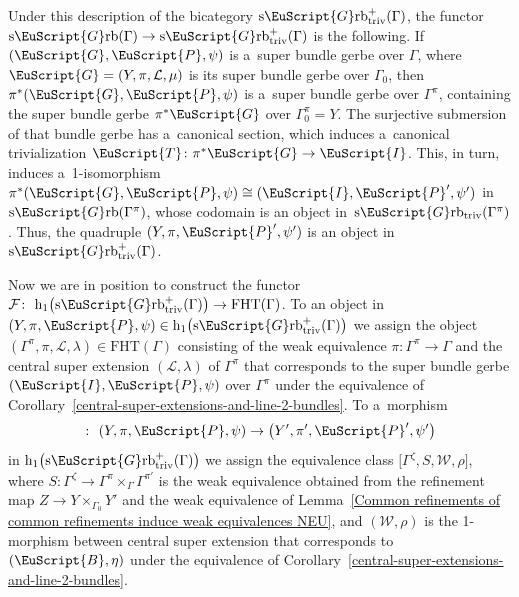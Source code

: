 \documentclass[pdftex]{sigma}
\numberwithin{equation}{section}
\def\mathscr#1{\EuScript{#1}}
\def\hc#1{\mathrm{h}_{#1}}
\newcommand{\Grb}{\mathscr{G}\mathrm{rb}}
\newcommand{\Grbtriv}{\mathscr{G}\mathrm{rb}_{\mathrm{triv}}}
\newcommand{\sGrb}{\mathrm{s}\Grb}
\newcommand{\sGrbtriv}{\mathrm{s}\Grbtriv}
\begin{document}
\begin{Remark}
Under this description of the bicategory $\sGrbtriv^{+}(\Gamma)$, the functor $\sGrb(\Gamma) \to \sGrbtriv^{+}(\Gamma)$ is the following. If $(\mathscr{G},\mathscr{P},\psi)$ is a~super bundle gerbe over $\Gamma$, where $\mathscr{G}=(Y,\pi,\mathcal{L},\mu)$ is its super bundle gerbe over $\Gamma_0$,
then $\pi^{*}(\mathscr{G},\mathscr{P},\psi)$ is a~super bundle gerbe over $\Gamma^{\pi}$, containing the super bundle gerbe $\pi^{*}\mathscr{G}$ over $\Gamma^{\pi}_0=Y$. The surjective submersion of that bundle gerbe has a~canonical section, which induces a~canonical trivialization $\mathscr{T}\colon \pi^{*}\mathscr{G} \to \mathscr{I}$. This, in turn, induces a~1-isomorphism $\pi^{*}(\mathscr{G},\mathscr{P},\psi) \cong (\mathscr{I},\mathscr{P}',\psi')$ in $\sGrb(\Gamma^{\pi})$, whose codomain is an object in~$\sGrbtriv(\Gamma^{\pi})$. Thus, the quadruple $(Y,\pi,\mathscr{P}',\psi')$ is an object in $\sGrbtriv^{+}(\Gamma)$.
\end{Remark}








Now we are in position to construct the functor
$
\mathcal{F}\colon\ \hc 1\bigl(\sGrbtriv^{+}(\Gamma)\bigr) \to \mathrm{FHT}(\Gamma)$.
 To an object in $(Y,\pi,\mathscr{P},\psi) \in \hc 1\bigl(\sGrbtriv^{+}(\Gamma)\bigr)$ we assign the object $(\Gamma^\pi,\pi,\mathcal{L},\lambda)\in\mathrm{FHT}(\Gamma)$ consisting of
 the weak equivalence $\pi\colon \Gamma^\pi \to \Gamma$ and the
 central super extension $(\mathcal{L},\lambda)$ of $\Gamma^{\pi}$ that corresponds to the super bundle gerbe $(\mathscr{I},\mathscr{P},\psi)$ over $\Gamma^{\pi}$ under the equivalence of Corollary~\ref{central-super-extensions-and-line-2-bundles}.
 To a~morphism
 \begin{equation*}
 [(Z,\zeta,\mathscr{B},\eta)] \colon\ (Y,\pi,\mathscr{P},\psi) \to \bigl(Y',\pi',\mathscr{P}',\psi'\bigr)
 \end{equation*}
 in $\hc 1\bigl(\sGrbtriv^{+}(\Gamma)\bigr)$ we assign the equivalence class
 $\big[\Gamma^{\zeta},S,\mathcal{W},\rho\big]$, where $S\colon \Gamma^{\zeta} \to \Gamma^\pi \times_{\Gamma} \Gamma^{\pi'}$ is the weak equivalence obtained from the refinement map $Z \to Y \times_{\Gamma_0} Y'$ and the weak equivalence of Lemma~\ref{Common refinements of common refinements induce weak equivalences NEU}, and $(\mathcal{W},\rho)$ is the 1-morphism between central super extension that corresponds to $(\mathscr{B},\eta)$ under the equivalence of Corollary~\ref{central-super-extensions-and-line-2-bundles}.
\end{document}

